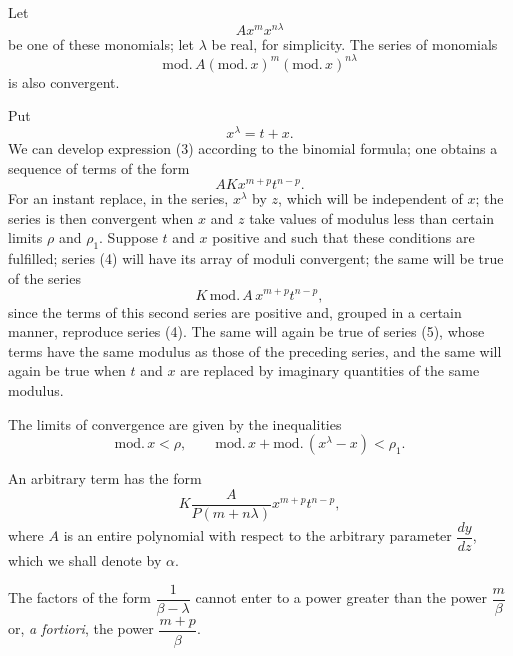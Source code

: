 \documentclass[11pt]{article}
\begin{document}
Let
\begin{equation*}\tag{3}
A x^m x^{n\lambda}
\end{equation*}
be one of these monomials; let $\lambda$ be real, for simplicity. The series of monomials
\begin{equation*}\tag{4}
\mathrm{mod}.\,A(\mathrm{mod}.\,x)^m(\mathrm{mod}.\,x)^{n\lambda}
\end{equation*}
is also convergent.

Put
\[
x^\lambda=t+x.
\]
We can develop expression (3) according to the binomial formula; one obtains a sequence of terms of the form
\begin{equation*}\tag{5}
AKx^{m+p}t^{n-p}.
\end{equation*}
For an instant replace, in the series, $x^\lambda$ by $z$, which will be independent of $x$; the series is then convergent when $x$ and $z$ take values of modulus less than certain limits $\rho$ and $\rho_1$. Suppose $t$ and $x$ positive and such that these conditions are fulfilled; series (4) will have its array of moduli convergent; the same will be true of the series
\[
K\,\mathrm{mod}.\,A\,x^{m+p}t^{n-p},
\]
since the terms of this second series are positive and, grouped in a certain manner, reproduce series (4). The same will again be true of series (5), whose terms have the same modulus as those of the preceding series, and the same will again be true when $t$ and $x$ are replaced by imaginary quantities of the same modulus.

The limits of convergence are given by the inequalities
\[
\mathrm{mod}.\,x<\rho,
\qquad
\mathrm{mod}.\,x+\mathrm{mod}.\,(x^\lambda-x)<\rho_1.
\]

An arbitrary term has the form
\[
K\frac{A}{P(m+n\lambda)}x^{m+p}t^{n-p},
\]
where $A$ is an entire polynomial with respect to the arbitrary parameter $\dfrac{dy}{dz}$, which we shall denote by $\alpha$.

The factors of the form $\dfrac{1}{\beta-\lambda}$ cannot enter to a power greater than the power $\dfrac{m}{\beta}$ or, \emph{a fortiori}, the power $\dfrac{m+p}{\beta}$.
\end{document}
